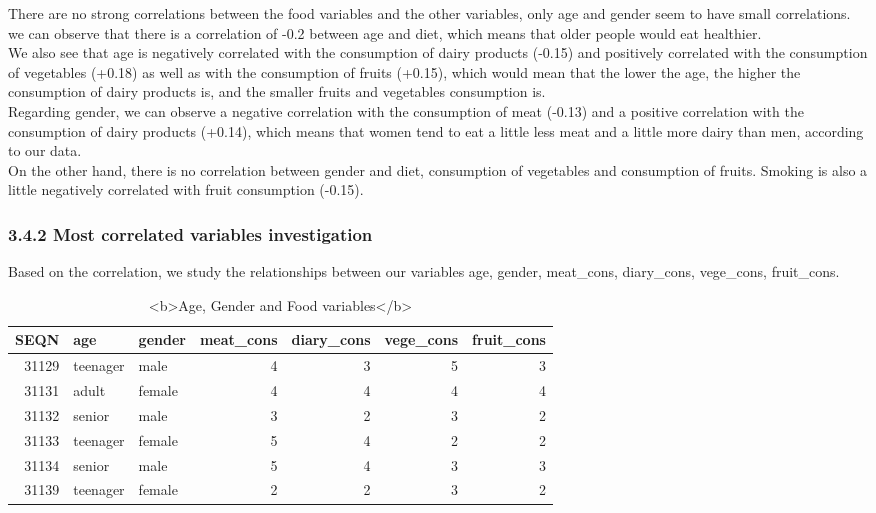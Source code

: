 \documentclass[
]{article}
\begin{document}
There are no strong correlations between the food variables and the
other variables, only age and gender seem to have small correlations. we
can observe that there is a correlation of -0.2 between age and diet,
which means that older people would eat healthier.\\
We also see that age is negatively correlated with the consumption of
dairy products (-0.15) and positively correlated with the consumption of
vegetables (+0.18) as well as with the consumption of fruits (+0.15),
which would mean that the lower the age, the higher the consumption of
dairy products is, and the smaller fruits and vegetables consumption
is.\\
Regarding gender, we can observe a negative correlation with the
consumption of meat (-0.13) and a positive correlation with the
consumption of dairy products (+0.14), which means that women tend to
eat a little less meat and a little more dairy than men, according to
our data.\\
On the other hand, there is no correlation between gender and diet,
consumption of vegetables and consumption of fruits. Smoking is also a
little negatively correlated with fruit consumption (-0.15).

\hypertarget{most-correlated-variables-investigation}{%
\subsubsection{3.4.2 Most correlated variables
investigation}\label{most-correlated-variables-investigation}}

Based on the correlation, we study the relationships between our
variables age, gender, meat\_cons, diary\_cons, vege\_cons, fruit\_cons.

\begin{table}

\caption{\label{tab:unnamed-chunk-85}<b>Age, Gender and Food variables</b>}
\centering
\begin{tabular}[t]{r|l|l|r|r|r|r}
\hline
SEQN & age & gender & meat\_cons & diary\_cons & vege\_cons & fruit\_cons\\
\hline
31129 & teenager & male & 4 & 3 & 5 & 3\\
\hline
31131 & adult & female & 4 & 4 & 4 & 4\\
\hline
31132 & senior & male & 3 & 2 & 3 & 2\\
\hline
31133 & teenager & female & 5 & 4 & 2 & 2\\
\hline
31134 & senior & male & 5 & 4 & 3 & 3\\
\hline
31139 & teenager & female & 2 & 2 & 3 & 2\\
\hline
\end{tabular}
\end{table}
\end{document}
